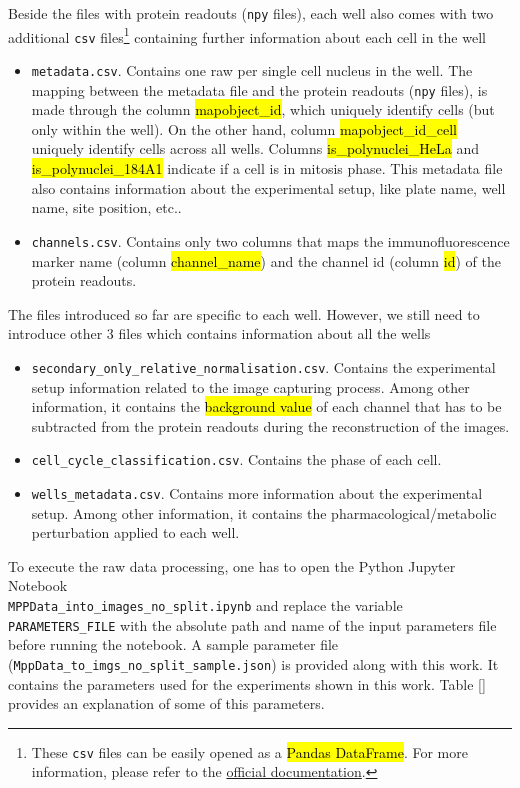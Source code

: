 Beside the files with protein readouts (\texttt{npy} files), each well also comes with two additional \texttt{csv} files\footnote{These \texttt{csv} files can be easily opened as a \hl{Pandas DataFrame}. For more information, please refer to the \href{https://pandas.pydata.org/pandas-docs/stable/reference/api/pandas.DataFrame.html}{official documentation}.} containing further information about each cell in the well

\begin{itemize}
  \item \texttt{metadata.csv}. Contains one raw per single cell nucleus in the well. The mapping between the metadata file and the protein readouts (\texttt{npy} files), is made through the column \hl{mapobject\_id}, which uniquely identify cells (but only within the well). On the other hand, column \hl{mapobject\_id\_cell} uniquely identify cells across all wells. Columns \hl{is\_polynuclei\_HeLa} and	\hl{is\_polynuclei\_184A1} indicate if a cell is in mitosis phase. This metadata file also contains information about the experimental setup, like plate name, well name, site position, etc..
  \item \texttt{channels.csv}. Contains only two columns that maps the immunofluorescence marker name (column \hl{channel\_name}) and the channel id (column \hl{id}) of the protein readouts.
\end{itemize}

The files introduced so far are specific to each well. However, we still need to introduce other 3 files which contains information about all the wells

\begin{itemize}
  \item \texttt{secondary\_only\_relative\_normalisation.csv}. Contains the experimental setup information related to the image capturing process. Among other information, it contains the \hl{background value} of each channel that has to be subtracted from the protein readouts during the reconstruction of the images.
  \item \texttt{cell\_cycle\_classification.csv}. Contains the phase of each cell.
  \item \texttt{wells\_metadata.csv}. Contains more information about the experimental setup. Among other information, it contains the pharmacological/metabolic perturbation applied to each well.
\end{itemize}

To execute the raw data processing, one has to open the Python Jupyter Notebook \\
\noindent\texttt{MPPData\_into\_images\_no\_split.ipynb} and replace the variable \texttt{PARAMETERS\_FILE} with the absolute path and name of the input parameters file before running the notebook. A sample parameter file (\texttt{MppData\_to\_imgs\_no\_split\_sample.json}) is provided along with this work. It contains the parameters used for the experiments shown in this work. Table \ref{} provides an explanation of some of this parameters.

